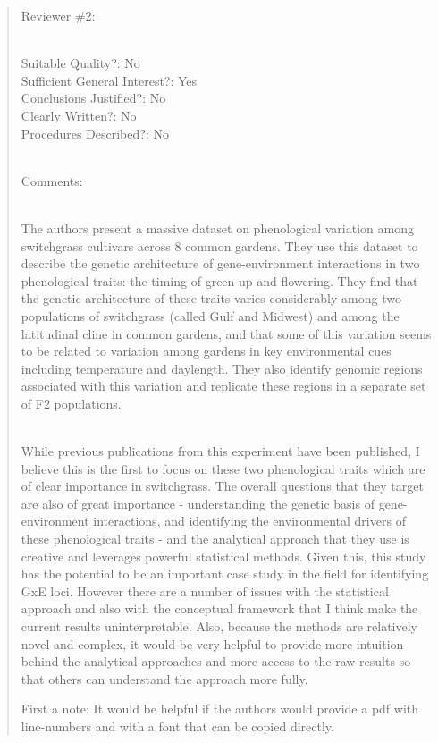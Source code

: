 \documentclass[
  letterpaper,
  DIV=11,
  numbers=noendperiod]{scrartcl}
\begin{document}
\begin{quote}
\begin{tcolorbox}[enhanced jigsaw, rightrule=.15mm, colframe=quarto-callout-warning-color-frame, leftrule=.75mm, arc=.35mm, colback=white, opacityback=0, left=2mm, breakable, toprule=.15mm, bottomrule=.15mm]

Reviewer \#2:\\
\strut \\
Suitable Quality?: No\\
Sufficient General Interest?: Yes\\
Conclusions Justified?: No\\
Clearly Written?: No\\
Procedures Described?: No\\
\strut \\
Comments:\\
\strut \\
The authors present a massive dataset on phenological variation among
switchgrass cultivars across 8 common gardens. They use this dataset to
describe the genetic architecture of gene-environment interactions in
two phenological traits: the timing of green-up and flowering. They find
that the genetic architecture of these traits varies considerably among
two populations of switchgrass (called Gulf and Midwest) and among the
latitudinal cline in common gardens, and that some of this variation
seems to be related to variation among gardens in key environmental cues
including temperature and daylength. They also identify genomic regions
associated with this variation and replicate these regions in a separate
set of F2 populations.\\
\strut \\
While previous publications from this experiment have been published, I
believe this is the first to focus on these two phenological traits
which are of clear importance in switchgrass. The overall questions that
they target are also of great importance - understanding the genetic
basis of gene-environment interactions, and identifying the
environmental drivers of these phenological traits - and the analytical
approach that they use is creative and leverages powerful statistical
methods. Given this, this study has the potential to be an important
case study in the field for identifying GxE loci. However there are a
number of issues with the statistical approach and also with the
conceptual framework that I think make the current results
uninterpretable. Also, because the methods are relatively novel and
complex, it would be very helpful to provide more intuition behind the
analytical approaches and more access to the raw results so that others
can understand the approach more fully.

First a note: It would be helpful if the authors would provide a pdf
with line-numbers and with a font that can be copied directly.

\end{tcolorbox}
\end{quote}
\end{document}
